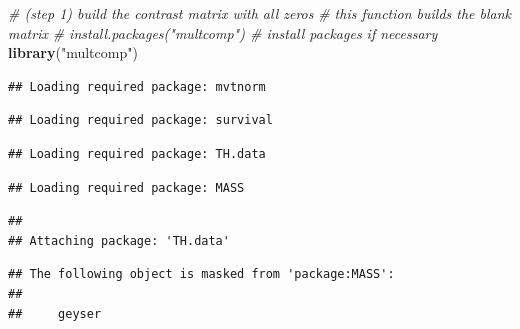 \documentclass[
  10pt,
]{book}
\newenvironment{Shaded}{\begin{snugshade}}{\end{snugshade}}
\newcommand{\CommentTok}[1]{\textcolor[rgb]{0.56,0.35,0.01}{\textit{#1}}}
\newcommand{\KeywordTok}[1]{\textcolor[rgb]{0.13,0.29,0.53}{\textbf{#1}}}
\newcommand{\NormalTok}[1]{#1}
\newcommand{\StringTok}[1]{\textcolor[rgb]{0.31,0.60,0.02}{#1}}
\begin{document}
\begin{Shaded}
\begin{Highlighting}[]
\CommentTok{# (step 1) build the contrast matrix with all zeros}
\CommentTok{# this function builds the blank matrix }
\CommentTok{# install.packages("multcomp") # install packages if necessary}
\KeywordTok{library}\NormalTok{(}\StringTok{"multcomp"}\NormalTok{)}
\end{Highlighting}
\end{Shaded}

\begin{verbatim}
## Loading required package: mvtnorm
\end{verbatim}

\begin{verbatim}
## Loading required package: survival
\end{verbatim}

\begin{verbatim}
## Loading required package: TH.data
\end{verbatim}

\begin{verbatim}
## Loading required package: MASS
\end{verbatim}

\begin{verbatim}
## 
## Attaching package: 'TH.data'
\end{verbatim}

\begin{verbatim}
## The following object is masked from 'package:MASS':
## 
##     geyser
\end{verbatim}
\end{document}
